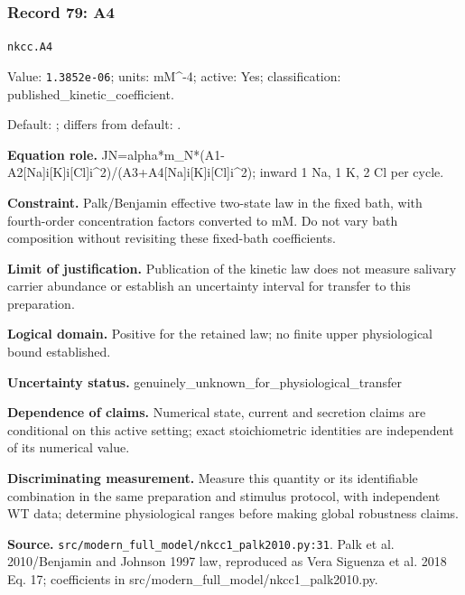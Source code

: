 \subsubsection*{Record 79: A4}
{\small \nolinkurl{nkcc.A4}\par

Value: \texttt{1.3852e-06}; units: mM\textasciicircum{}-4; active: Yes; classification: published\_kinetic\_coefficient.\par

Default: ; differs from default: .\par

\textbf{Equation role.} JN=alpha*m\_N*(A1-A2[Na]i[K]i[Cl]i\textasciicircum{}2)/(A3+A4[Na]i[K]i[Cl]i\textasciicircum{}2); inward 1 Na, 1 K, 2 Cl per cycle.\par

\textbf{Constraint.} Palk/Benjamin effective two-state law in the fixed bath, with fourth-order concentration factors converted to mM. Do not vary bath composition without revisiting these fixed-bath coefficients.\par

\textbf{Limit of justification.} Publication of the kinetic law does not measure salivary carrier abundance or establish an uncertainty interval for transfer to this preparation.\par

\textbf{Logical domain.} Positive for the retained law; no finite upper physiological bound established.\par

\textbf{Uncertainty status.} genuinely\_unknown\_for\_physiological\_transfer\par

\textbf{Dependence of claims.} Numerical state, current and secretion claims are conditional on this active setting; exact stoichiometric identities are independent of its numerical value.\par

\textbf{Discriminating measurement.} Measure this quantity or its identifiable combination in the same preparation and stimulus protocol, with independent WT data; determine physiological ranges before making global robustness claims.\par

\textbf{Source.} \nolinkurl{src/modern_full_model/nkcc1_palk2010.py:31}. Palk et al. 2010/Benjamin and Johnson 1997 law, reproduced as Vera Siguenza et al. 2018 Eq. 17; coefficients in src/modern\_full\_model/nkcc1\_palk2010.py.\par}

